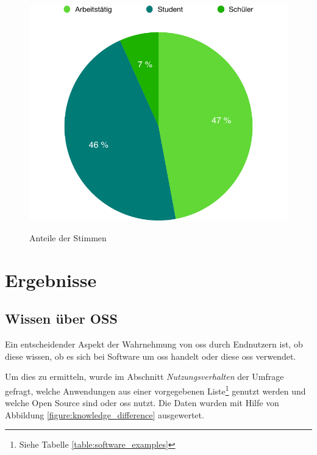 \documentclass[a4paper]{article}
\begin{document}
\begin{figure}[h]
            \centering
            \begin{minipage}{.5\textwidth}
                \centering
                \includegraphics[width=\textwidth]{assets/results/validity/rowsPerActivity}
                \label{fig:rowsPer:activity}
            \end{minipage}
            \caption{Anteile der Stimmen}
        \end{figure}

    \section{Ergebnisse}
        \subsection{Wissen über OSS}\label{section:knowledge_oss}
            Ein entscheidender Aspekt der Wahrnehmung von \gls{oss} durch Endnutzern ist, ob diese wissen, ob es sich bei Software um \gls{oss} handelt oder diese \gls{oss} verwendet.
            
            Um dies zu ermitteln, wurde im Abschnitt \emph{Nutzungsverhalten} der Umfrage gefragt, welche Anwendungen aus einer vorgegebenen Liste\footnote{Siehe Tabelle \ref{table:software_examples}} genutzt werden und welche Open Source sind oder \gls{oss} nutzt. Die Daten wurden mit Hilfe von Abbildung \ref{figure:knowledge_difference} ausgewertet.
            
\end{document}
